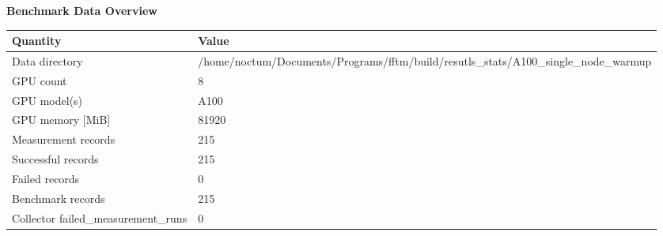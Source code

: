 \documentclass{article}
\begin{document}
\begin{center}
{\fontsize{8.0pt}{9.4pt}\selectfont
\textbf{Benchmark Data Overview}

\vspace{0.6em}
\begin{tabular}{ll}
\hline
Quantity & Value \\
\hline
Data directory & /home/noctum/Documents/Programs/fftm/build/resutls\_stats/A100\_single\_node\_warmup \\
GPU count & 8 \\
GPU model(s) & A100 \\
GPU memory [MiB] & 81920 \\
Measurement records & 215 \\
Successful records & 215 \\
Failed records & 0 \\
Benchmark records & 215 \\
Collector failed\_measurement\_runs & 0 \\
\hline
\end{tabular}
}
\end{center}
\end{document}
